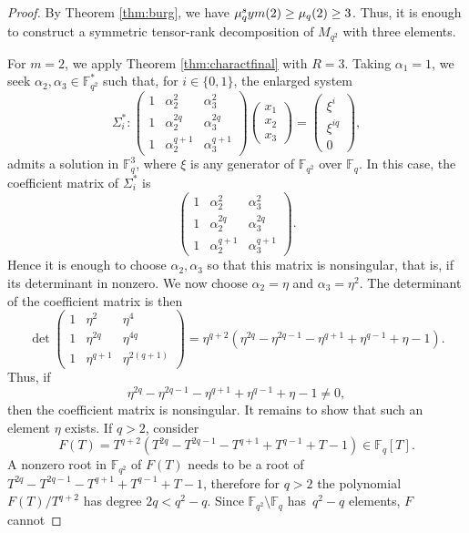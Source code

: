 \documentclass[10pt,a4paper]{amsart}
\newcommand{\F}{\numberset{F}}
\newcommand{\fq}{\F_q}
\newcommand{\numberset}{\mathbb}
\def\sym{\textup{sym}}
\begin{document}
\begin{proof}
By Theorem \ref{thm:burg}, we have $ \mu_q^\sym(2) \geq  \mu_q(2)\geq 3$.
Thus, it is enough to construct a symmetric tensor-rank decomposition of
\(M_{q^2}\) with three elements.

For \(m=2\), we apply Theorem \ref{thm:charactfinal} with \(R=3\). Taking
\(\alpha_1=1\), we seek \(\alpha_2,\alpha_3\in\mathbb F_{q^2}^{*}\) such that, for
\(i\in\{0,1\}\), the enlarged system
\[ \Sigma_i^* \colon \begin{pmatrix}
1 & \alpha_2^2 & \alpha_3^2\\
1 & \alpha_2^{2	q} & \alpha_3^{2q}\\
1 & \alpha_2^{q+1} &  \alpha_3^{q+1}
\end{pmatrix}
\begin{pmatrix} x_1 \\ x_2 \\ x_3 \end{pmatrix} = \begin{pmatrix} \xi^i \\ \xi^{iq} \\ 0 \end{pmatrix},
 \]
admits a solution in
\(\mathbb F_q^3\), where $\xi$ is any generator of $\F_{q^2}$ over $\fq$.
In this case, the coefficient matrix of \(\Sigma_i^*\) is
\[
\begin{pmatrix}
1 & \alpha_2^2 & \alpha_3^2\\
1 & \alpha_2^{2q} & \alpha_3^{2q}\\
1 & \alpha_2^{q+1} & \alpha_3^{q+1}
\end{pmatrix}.
\]
Hence it is enough to choose \(\alpha_2,\alpha_3\) so that this matrix is nonsingular, that is, if its determinant in nonzero. We now choose \(\alpha_2=\eta\) and \(\alpha_3=\eta^2\). The determinant of the
coefficient matrix is then
\[
\det
\begin{pmatrix}
1 & \eta^2 & \eta^4\\
1 & \eta^{2q} & \eta^{4q}\\
1 & \eta^{q+1} & \eta^{2(q+1)}
\end{pmatrix}
=
\eta^{q+2}
\left(
\eta^{2q}-\eta^{2q-1}-\eta^{q+1}+\eta^{q-1}+\eta-1
\right).
\]
Thus, if
\[
\eta^{2q}-\eta^{2q-1}-\eta^{q+1}+\eta^{q-1}+\eta-1\neq 0,
\]
then the coefficient matrix is nonsingular. It remains to show that such an element \(\eta\) exists. If \(q>2\), consider
\[
F(T)=T^{q+2}
\left(
T^{2q}-T^{2q-1}-T^{q+1}+T^{q-1}+T-1
\right)\in \mathbb F_q[T].
\]
A nonzero root in $\F_{q^2}$ of $F(T)$ needs to be a root of $T^{2q}-T^{2q-1}-T^{q+1}+T^{q-1}+T-1$, therefore for $q>2$  the polynomial \(F(T)/T^{q+2}\) has degree \(2q<q^2-q\). Since \(\mathbb F_{q^2}\setminus\mathbb F_q\) has~\(q^2-q\) elements, \(F\) cannot

\end{proof}
\end{document}
